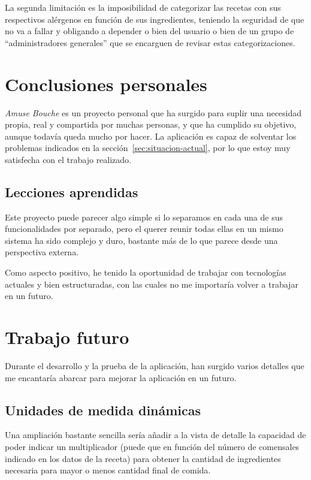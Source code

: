 La segunda limitación es la imposibilidad de categorizar las recetas con sus
respectivos alérgenos en función de sus ingredientes, teniendo la seguridad de
que no va a fallar y obligando a depender o bien del usuario o bien de un grupo
de ``administradores generales'' que se encarguen de revisar estas
categorizaciones.

\section{Conclusiones personales}

\textit{Amuse Bouche} es un proyecto personal que ha surgido para suplir una
necesidad propia, real y compartida por muchas personas, y que ha cumplido su
objetivo, aunque todavía queda mucho por hacer. La aplicación es capaz de
solventar los problemas indicados en la sección~\ref{sec:situacion-actual}, por
lo que estoy muy satisfecha con el trabajo realizado.

\subsection{Lecciones aprendidas}

Este proyecto puede parecer algo simple si lo separamos en cada una de sus
funcionalidades por separado, pero el querer reunir todas ellas en un mismo
sistema ha sido complejo y duro, bastante más de lo que parece desde una
perspectiva externa.

Como aspecto positivo, he tenido la oportunidad de trabajar con tecnologías
actuales y bien estructuradas, con las cuales no me importaría volver a trabajar
en un futuro.

\section{Trabajo futuro}

Durante el desarrollo y la prueba de la aplicación, han surgido varios detalles
que me encantaría abarcar para mejorar la aplicación en un futuro.

\subsection{Unidades de medida dinámicas}

Una ampliación bastante sencilla sería añadir a la vista de detalle la capacidad
de poder indicar un multiplicador (puede que en función del número de comensales
indicado en los datos de la receta) para obtener la cantidad de ingredientes
necesaria para mayor o menos cantidad final de comida.


